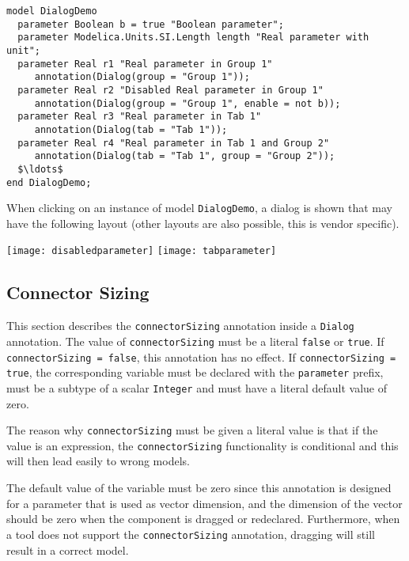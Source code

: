 \begin{annotationdefinition}[Dialog]
\begin{semantics}
\begin{example}
\begin{lstlisting}[language=modelica]
model DialogDemo
  parameter Boolean b = true "Boolean parameter";
  parameter Modelica.Units.SI.Length length "Real parameter with unit";
  parameter Real r1 "Real parameter in Group 1"
     annotation(Dialog(group = "Group 1"));
  parameter Real r2 "Disabled Real parameter in Group 1"
     annotation(Dialog(group = "Group 1", enable = not b));
  parameter Real r3 "Real parameter in Tab 1"
     annotation(Dialog(tab = "Tab 1"));
  parameter Real r4 "Real parameter in Tab 1 and Group 2"
     annotation(Dialog(tab = "Tab 1", group = "Group 2"));
  $\ldots$
end DialogDemo;
\end{lstlisting}
When clicking on an instance of model \lstinline!DialogDemo!, a dialog is shown that may have the following layout (other layouts are also possible, this is vendor specific).

\begin{center}
\texttt{[image: disabledparameter]}
\quad
\texttt{[image: tabparameter]}\\
\end{center}
\end{example}
\end{semantics}
\end{annotationdefinition}

\subsection{Connector Sizing}\label{connector-sizing}

This section describes the \lstinline!connectorSizing! annotation inside a \lstinline!Dialog! annotation.
The value of \lstinline!connectorSizing! must be a literal \lstinline!false! or \lstinline!true!.
If \lstinline!connectorSizing = false!, this annotation has no effect.
If \lstinline!connectorSizing = true!, the corresponding variable must be declared with the \lstinline!parameter! prefix, must be a subtype of a scalar \lstinline!Integer! and must have a literal default value of zero.

\begin{nonnormative}
The reason why \lstinline!connectorSizing! must be given a literal value is that if the value is an expression,
the \lstinline!connectorSizing! functionality is conditional and this will then lead easily to wrong models.

The default value of the variable must be zero since this annotation is designed for a parameter that is used as vector dimension, and the dimension of the vector should be zero when the component is dragged or redeclared.
Furthermore, when a tool does not support the \lstinline!connectorSizing! annotation, dragging will still result in a correct model.
\end{nonnormative}

